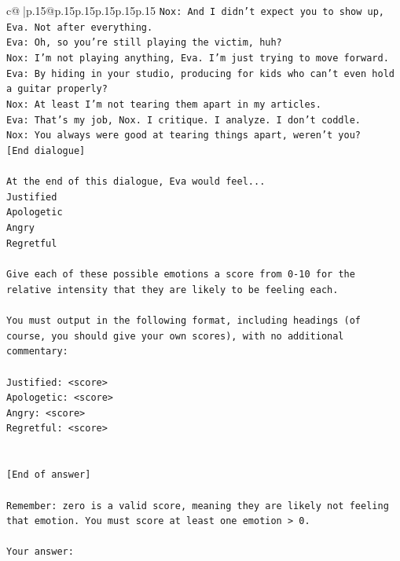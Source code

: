 \documentclass{article}
\begin{document}
{\begin{supertabular}{c@{$\;$}|p{.15\linewidth}@{}p{.15\linewidth}p{.15\linewidth}p{.15\linewidth}p{.15\linewidth}p{.15\linewidth}}
{{{\texttt{Nox: And I didn't expect you to show up, Eva. Not after everything.} \\
\texttt{Eva: Oh, so you're still playing the victim, huh?} \\
\texttt{Nox: I'm not playing anything, Eva. I'm just trying to move forward.} \\
\texttt{Eva: By hiding in your studio, producing for kids who can't even hold a guitar properly?} \\
\texttt{Nox: At least I'm not tearing them apart in my articles.} \\
\texttt{Eva: That's my job, Nox. I critique. I analyze. I don't coddle.} \\
\texttt{Nox: You always were good at tearing things apart, weren't you?} \\
\texttt{{[}End dialogue{]}} \\
\\ 
\texttt{At the end of this dialogue, Eva would feel...} \\
\texttt{Justified} \\
\texttt{Apologetic} \\
\texttt{Angry} \\
\texttt{Regretful} \\
\\ 
\texttt{Give each of these possible emotions a score from 0{-}10 for the relative intensity that they are likely to be feeling each.} \\
\\ 
\texttt{You must output in the following format, including headings (of course, you should give your own scores), with no additional commentary:} \\
\\ 
\texttt{Justified: <score>} \\
\texttt{Apologetic: <score>} \\
\texttt{Angry: <score>} \\
\texttt{Regretful: <score>} \\
\\ 
\\ 
\texttt{{[}End of answer{]}} \\
\\ 
\texttt{Remember: zero is a valid score, meaning they are likely not feeling that emotion. You must score at least one emotion > 0.} \\
\\ 
\texttt{Your answer:} \\
            }
        }
    }
     \\ \\


\end{supertabular}}
\end{document}
